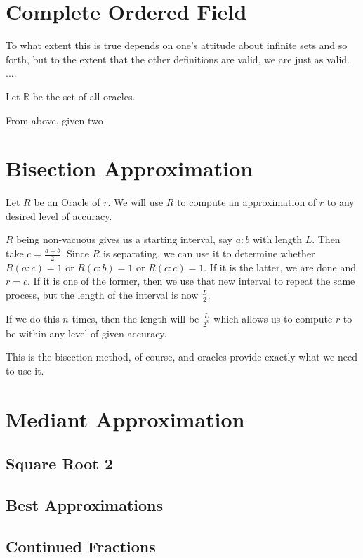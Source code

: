 \documentclass[12pt]{article}
\begin{document}
\section{Complete Ordered Field}

To what extent this is true depends on one's attitude about infinite sets and so forth, but to the extent that the other definitions are valid, we are just as valid. ....

Let $\mathbb{R}$ be the set of all oracles. 

From above, given two 

\section{Bisection Approximation}

Let $R$ be an Oracle of $r$. We will use $R$ to compute an approximation of $r$ to any desired level of accuracy.

$R$ being non-vacuous gives us a starting interval, say $a:b$ with length $L$. Then take $c = \frac{a+b}{2}$. Since $R$ is separating, we can use it to determine whether $R(a:c) = 1$ or $R(c:b) = 1$ or $R(c:c) = 1$. If it is the latter, we are done and $r = c$. If it is one of the former, then we use that new interval to repeat the same process, but the length of the interval is now $\frac{L}{2}$. 

If we do this $n$ times, then the length will be $\frac{L}{2^n}$ which allows us to compute $r$ to be within any level of given accuracy. 

This is the bisection method, of course, and oracles provide exactly what we need to use it. 

\section{Mediant Approximation}

\subsection{Square Root 2}

\subsection{Best Approximations}

\subsection{Continued Fractions}
\end{document}
